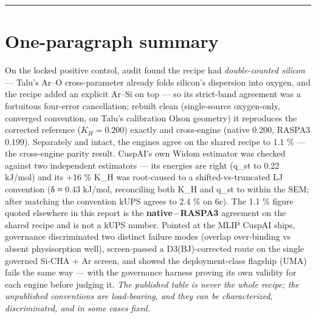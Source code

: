 \begin{center}\rule{0.5\linewidth}{0.5pt}\end{center}

\section{One-paragraph summary}\label{one-paragraph-summary}

On the locked positive control, audit found the recipe had
\emph{double-counted silicon} --- Talu's Ar--O cross-parameter already folds
silicon's dispersion into oxygen, and the recipe added an explicit Ar--Si
on top --- so its strict-band agreement was a fortuitous four-error cancellation; rebuilt clean
(single-source oxygen-only, converged convention, on Talu's calibration
Olson geometry) it reproduces the corrected reference (\(K_H = 0.200\))
exactly and cross-engine (native 0.200, RASPA3 0.199). Separately and
intact, the engines agree on the shared recipe to 1.1 \% --- the
cross-engine parity result. CuspAI's own
Widom estimator was checked against two independent estimators --- its
energies are right (q\_st to 0.22 kJ/mol) and its +16 \% K\_H was
root-caused to a shifted-vs-truncated LJ convention (δ ≈ 0.43 kJ/mol,
reconciling both K\_H and q\_st to within the SEM; after matching the
convention kUPS agrees to 2.4 \% on 6c). The 1.1 \% figure quoted
elsewhere in this report is the \textbf{native\,--\,RASPA3} agreement on
the shared recipe and is not a kUPS number. Pointed at the MLIP
CuspAI ships, governance discriminated two distinct failure modes
(overlap over-binding vs absent physisorption well), screen-passed a
D3(BJ)-corrected route on the single governed Si-CHA + Ar screen, and
showed the deployment-class flagship (UMA) fails the same way
--- with the governance harness proving its own validity for each engine
before judging it. \emph{The published table is never the whole recipe;
the unpublished conventions are load-bearing, and they can be
characterized, discriminated, and in some cases fixed.}

